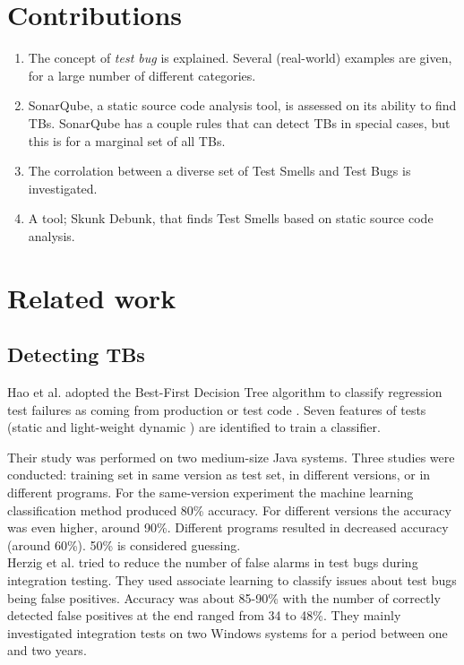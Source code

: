 \documentclass{uvamscse}
\newcommand{\toolName}{Skunk Debunk}
\newcommand{\Aobsolete}{Hao et al.}
\begin{document}
\section{Contributions}
\begin{enumerate}
	\item The concept of \emph{test bug} is explained. Several (real-world) examples are given, for a large number of different categories.
	\item SonarQube, a static source code analysis tool, is assessed on its ability to find TBs. SonarQube has a couple rules that can detect TBs in special cases, but this is for a marginal set of all TBs. 
	\item The corrolation between a diverse set of Test Smells and Test Bugs is investigated.
	\item A tool; \toolName, that finds Test Smells based on static source code analysis.
\end{enumerate}

\section{Related work}
\subsection{Detecting TBs}
\Aobsolete{} adopted the Best-First Decision Tree algorithm to classify regression test failures as coming from production or test code \cite{hao2013bug}. Seven features of tests (static and light-weight dynamic ) are identified to train a classifier.  
 
Their study was performed on two medium-size Java systems. Three studies were conducted: training set in same version as test set, in different versions, or in different programs. For the same-version experiment the machine learning classification method produced 80\% accuracy. For different versions the accuracy was even higher, around 90\%. Different programs resulted in decreased accuracy (around 60\%). 50\% is considered guessing. \\

Herzig et al. \cite{herzig2015empirically} tried to reduce the number of false alarms in test bugs during integration testing. They used associate learning to classify issues about test bugs being false positives. Accuracy was about 85-90\% with the number of correctly detected false positives at the end ranged from 34 to 48\%. They mainly investigated integration tests on two Windows systems for a period between one and two years. \\
\end{document}
